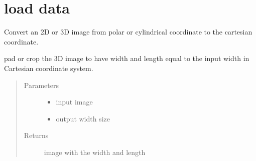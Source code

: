 \documentclass[letterpaper,10pt,english]{sphinxmanual}
\begin{document}
\section{load data}
\label{\detokenize{index:module-util.load_data}}\label{\detokenize{index:load-data}}
Convert an 2D or 3D image from polar or cylindrical coordinate to the
cartesian coordinate.

\begin{fulllineitems}
\label{\detokenize{index:util.load_data.im_fix_width}}
pad or crop the 3D image to have width and length equal to the input width in Cartesian coordinate system.
\begin{quote}\begin{description}
\item[{Parameters}] \leavevmode\begin{itemize}
\item {} 
 \textendash{} input image

\item {} 
 \textendash{} output width size

\end{itemize}

\item[{Returns}] \leavevmode
image with the  width and length

\end{description}\end{quote}

\end{fulllineitems}

\end{document}
